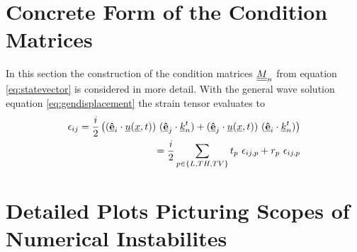 \section{Concrete Form of the Condition Matrices}
In this section the construction of the condition matrices $\underline{\underline{M}}_n$ from
equation \ref{eq:statevector} is considered in more detail.
With the general wave solution equation \ref{eq:gendisplacement} the strain
tensor evaluates to
\begin{align}
    \epsilon_{ij} = \frac{i}{2} \left(
    (\underline{\vu{e}}_i\cdot \underline{u}(\underline{x}, t))\
    (\underline{\vu{e}}_j\cdot \underline{k}^t_{n})
    + (\underline{\vu{e}}_j\cdot  \underline{u}(\underline{x}, t))\
    (\underline{\vu{e}}_i\cdot \underline{k}^t_{n}) \right) \\
    = \frac{i}{2}\sum\limits_{p\in\{L,TH,TV\}} 
    t_p\ \epsilon_{ij,p} + r_p\ \epsilon_{ij,p} 
\end{align}


\section{Detailed Plots Picturing Scopes of Numerical Instabilites}